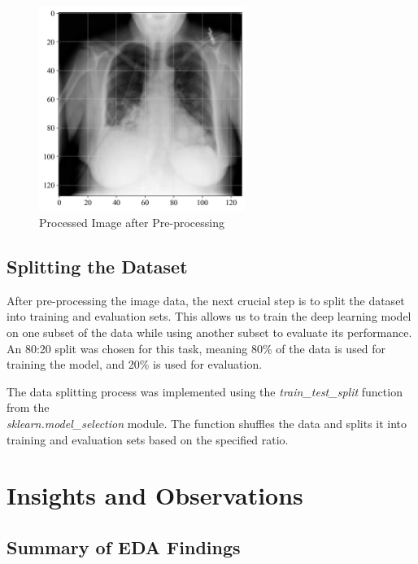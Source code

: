 \begin{figure}[H]
    \begin{center}
        \includegraphics[width = 0.6\textwidth]{figures/Figure28.png}
        \caption{Processed Image after Pre-processing}
        \label{fig:cha-2 figure23}
    \end{center}
\end{figure}

\subsection{Splitting the Dataset}
\label{subsec:chap2 section 2.2}

After pre-processing the image data, the next crucial step is to split the dataset into training and evaluation sets. This allows us to train the deep learning model on one subset of the data while using another subset to evaluate its performance. An 80:20 split was chosen for this task, meaning 80\% of the data is used for training the model, and 20\% is used for evaluation.

The data splitting process was implemented using the \emph{train\_test\_split} function from the \\ \emph{sklearn.model\_selection} module. The function shuffles the data and splits it into training and evaluation sets based on the specified ratio.
\section{Insights and Observations}
\label{sec:chap2 section 3}

\subsection{Summary of EDA Findings}
\label{subsec:chap2 section 3.1}

